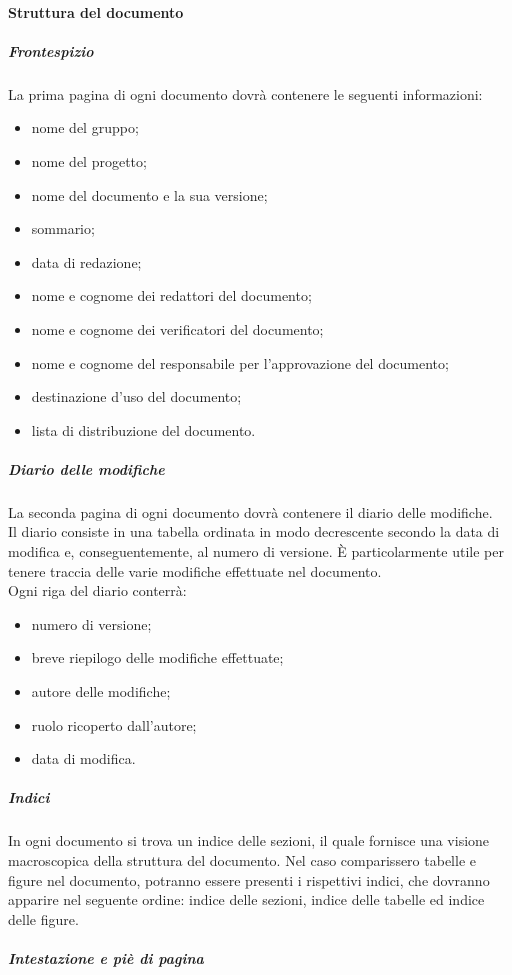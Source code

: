	\paragraph{Struttura del documento}
		\subparagraph{Frontespizio}
		La prima pagina di ogni documento dovrà contenere le seguenti informazioni:
		\begin{itemize}
			\item nome del gruppo;
			\item nome del progetto;
			\item nome del documento e la sua versione;
			\item sommario;
			\item data di redazione;
			\item nome e cognome dei redattori del documento;
			\item nome e cognome dei verificatori del documento;
			\item nome e cognome del responsabile per l'approvazione del documento;
			\item destinazione d'uso del documento;
			\item lista di distribuzione del documento.
		\end{itemize}
		\subparagraph{Diario delle modifiche}
		La seconda pagina di ogni documento dovrà contenere il diario delle modifiche.\\
		Il diario consiste in una tabella ordinata in modo decrescente secondo la data di modifica e, conseguentemente, al numero di versione. È particolarmente utile per tenere traccia delle varie modifiche effettuate nel documento. \\
		Ogni riga del diario conterrà:
		\begin{itemize}
			\item numero di versione;
			\item breve riepilogo delle modifiche effettuate;
			\item autore delle modifiche;
			\item ruolo ricoperto dall'autore;
			\item data di modifica.
		\end{itemize}		
		\subparagraph{Indici}
		In ogni documento si trova un indice delle sezioni, il quale fornisce una visione macroscopica della struttura del documento. Nel caso comparissero tabelle e figure nel documento, potranno essere presenti i rispettivi indici, che dovranno apparire nel seguente ordine: indice delle sezioni, indice delle tabelle ed indice delle figure.
		\subparagraph{Intestazione e piè di pagina}
